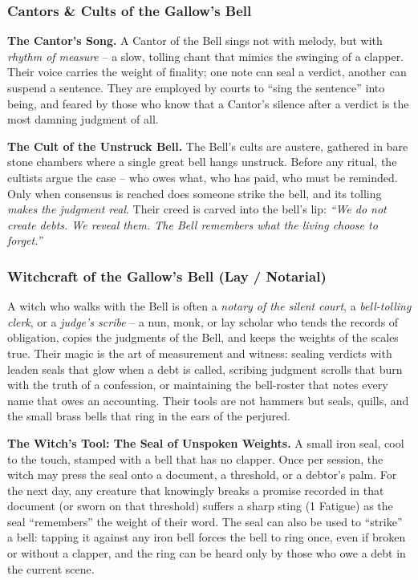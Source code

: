 \subsubsection*{Cantors \& Cults of the Gallow's Bell}

\textbf{The Cantor's Song.} A Cantor of the Bell sings not with melody, but with \textit{rhythm of measure} -- a slow, tolling chant that mimics the swinging of a clapper. Their voice carries the weight of finality; one note can seal a verdict, another can suspend a sentence. They are employed by courts to ``sing the sentence'' into being, and feared by those who know that a Cantor's silence after a verdict is the most damning judgment of all.

\textbf{The Cult of the Unstruck Bell.} The Bell's cults are austere, gathered in bare stone chambers where a single great bell hangs unstruck. Before any ritual, the cultists argue the case -- who owes what, who has paid, who must be reminded. Only when consensus is reached does someone strike the bell, and its tolling \textit{makes the judgment real}. Their creed is carved into the bell's lip: \textit{``We do not create debts. We reveal them. The Bell remembers what the living choose to forget.''}

\subsubsection*{Witchcraft of the Gallow's Bell (Lay / Notarial)}

A witch who walks with the Bell is often a \textit{notary of the silent court}, a \textit{bell-tolling clerk}, or a \textit{judge's scribe} -- a nun, monk, or lay scholar who tends the records of obligation, copies the judgments of the Bell, and keeps the weights of the scales true. Their magic is the art of measurement and witness: sealing verdicts with leaden seals that glow when a debt is called, scribing judgment scrolls that burn with the truth of a confession, or maintaining the bell-roster that notes every name that owes an accounting. Their tools are not hammers but seals, quills, and the small brass bells that ring in the ears of the perjured.

\textbf{The Witch's Tool: The Seal of Unspoken Weights.} A small iron seal, cool to the touch, stamped with a bell that has no clapper. Once per session, the witch may press the seal onto a document, a threshold, or a debtor's palm. For the next day, any creature that knowingly breaks a promise recorded in that document (or sworn on that threshold) suffers a sharp sting (1 Fatigue) as the seal ``remembers'' the weight of their word. The seal can also be used to ``strike'' a bell: tapping it against any iron bell forces the bell to ring once, even if broken or without a clapper, and the ring can be heard only by those who owe a debt in the current scene.

